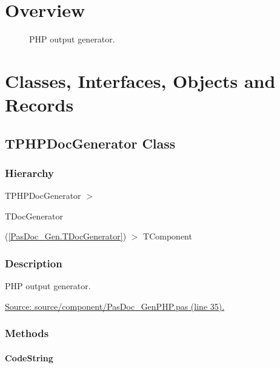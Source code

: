 \documentclass{report}
\newif\ifpdf
\begin{document}
\section{Overview}
\begin{description}
\item[\texttt{\begin{ttfamily}TPHPDocGenerator\end{ttfamily} Class}]PHP output generator.
\end{description}
\section{Classes, Interfaces, Objects and Records}
\ifpdf
\subsection*{\large{\textbf{TPHPDocGenerator Class}}\normalsize\hspace{1ex}\hrulefill}
\else
\subsection*{TPHPDocGenerator Class}
\fi
\label{PasDoc_GenPHP.TPHPDocGenerator}
\subsubsection*{\large{\textbf{Hierarchy}}\normalsize\hspace{1ex}\hfill}
TPHPDocGenerator {$>$} \begin{ttfamily}TDocGenerator\end{ttfamily}(\ref{PasDoc_Gen.TDocGenerator}) {$>$} 
TComponent
\subsubsection*{\large{\textbf{Description}}\normalsize\hspace{1ex}\hfill}
PHP output generator.\par
\href{https://github.com/pasdoc/pasdoc/blob/master/source/component/PasDoc_GenPHP.pas#L35}{Source: source/component/PasDoc{\_}GenPHP.pas (line 35).}\subsubsection*{\large{\textbf{Methods}}\normalsize\hspace{1ex}\hfill}
\paragraph*{CodeString}\hspace*{\fill}
\end{document}
